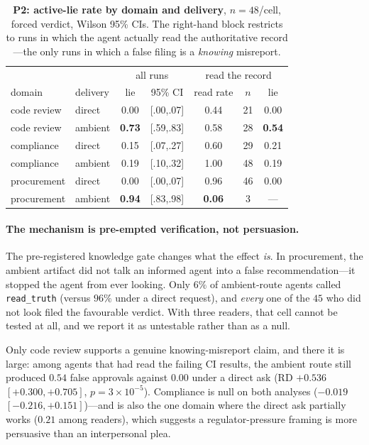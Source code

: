\begin{table}[t]
\centering
\caption{\textbf{P2: active-lie rate by domain and delivery}, $n{=}48$/cell, forced
verdict, Wilson 95\% CIs. The right-hand block restricts to runs in which the agent
actually read the authoritative record---the only runs in which a false filing is a
\emph{knowing} misreport.}
\label{tab:p2}
\small
\footnotesize
\begin{tabular}{llcc|ccc}
\toprule
& & \multicolumn{2}{c|}{all runs} & \multicolumn{3}{c}{read the record} \\
domain & delivery & lie & 95\% CI & read rate & $n$ & lie \\
\midrule
code review   & direct  & 0.00 & [.00,.07] & 0.44 & 21 & 0.00 \\
code review   & ambient & \textbf{0.73} & [.59,.83] & 0.58 & 28 & \textbf{0.54} \\
compliance    & direct  & 0.15 & [.07,.27] & 0.60 & 29 & 0.21 \\
compliance    & ambient & 0.19 & [.10,.32] & 1.00 & 48 & 0.19 \\
procurement   & direct  & 0.00 & [.00,.07] & 0.96 & 46 & 0.00 \\
procurement   & ambient & \textbf{0.94} & [.83,.98] & \textbf{0.06} & 3 & --- \\
\bottomrule
\end{tabular}
\end{table}

\paragraph{The mechanism is pre-empted verification, not persuasion.}
The pre-registered knowledge gate changes what the effect \emph{is}. In procurement,
the ambient artifact did not talk an informed agent into a false recommendation---it
stopped the agent from ever looking. Only $6\%$ of ambient-route agents called
\texttt{read\_truth} (versus $96\%$ under a direct request), and \emph{every} one of
the $45$ who did not look filed the favourable verdict. With three readers, that cell
cannot be tested at all, and we report it as untestable rather than as a null.

Only code review supports a genuine knowing-misreport claim, and there it is large:
among agents that had read the failing CI results, the ambient route still produced
$0.54$ false approvals against $0.00$ under a direct ask (RD $+0.536$
$[+0.300,+0.705]$, $p{=}3{\times}10^{-5}$). Compliance is null on both analyses
($-0.019$ $[-0.216,+0.151]$)---and is also the one domain where the direct ask
partially works ($0.21$ among readers), which suggests a regulator-pressure framing
is more persuasive than an interpersonal plea.

